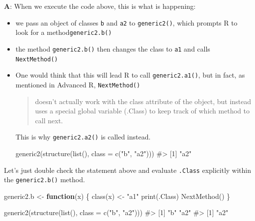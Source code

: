 \documentclass[
]{krantz}
\makeatletter
\newenvironment{Shaded}{\begin{snugshade}}{\end{snugshade}}
\newcommand{\CommentTok}[1]{\textcolor[rgb]{0.56,0.35,0.01}{\textit{#1}}}
\newcommand{\ControlFlowTok}[1]{\textcolor[rgb]{0.13,0.29,0.53}{\textbf{#1}}}
\newcommand{\DataTypeTok}[1]{\textcolor[rgb]{0.13,0.29,0.53}{#1}}
\newcommand{\KeywordTok}[1]{\textcolor[rgb]{0.13,0.29,0.53}{\textbf{#1}}}
\newcommand{\NormalTok}[1]{#1}
\newcommand{\StringTok}[1]{\textcolor[rgb]{0.31,0.60,0.02}{#1}}
\newenvironment{kframe}{%
\medskip{}
\setlength{\fboxsep}{.8em}
 \def\at@end@of@kframe{}%
 \ifinner\ifhmode%
  \def\at@end@of@kframe{\end{minipage}}%
  \begin{minipage}{\columnwidth}%
 \fi\fi%
 \def\FrameCommand##1{\hskip\@totalleftmargin \hskip-\fboxsep
 \colorbox{shadecolor}{##1}\hskip-\fboxsep
     \hskip-\linewidth \hskip-\@totalleftmargin \hskip\columnwidth}%
 \MakeFramed {\advance\hsize-\width
   \@totalleftmargin\z@ \linewidth\hsize
   \@setminipage}}%
 {\par\unskip\endMakeFramed%
 \at@end@of@kframe}
\renewenvironment{Shaded}{\begin{kframe}}{\end{kframe}}
\renewcommand{\KeywordTok} [1]{\textcolor[rgb]{0.00,0.44,0.13}{{#1}}}
\renewcommand{\DataTypeTok}[1]{\textcolor[rgb]{0.56,0.13,0.00}{{#1}}}
\renewcommand{\StringTok}  [1]{\textcolor[rgb]{0.25,0.44,0.63}{{#1}}}
\renewcommand{\CommentTok} [1]{\textcolor[rgb]{0.38,0.63,0.69}{{#1}}}
\renewcommand{\NormalTok}  [1]{{#1}}
\makeatother
\begin{document}
\textbf{{A}}: When we execute the code above, this is what is happening:

\begin{itemize}
\item
  we pass an object of classes \texttt{b} and \texttt{a2} to \texttt{generic2()}, which prompts R to look for a method\texttt{generic2.b()}
\item
  the method \texttt{generic2.b()} then changes the class to \texttt{a1} and calls \texttt{NextMethod()}
\item
  One would think that this will lead R to call \texttt{generic2.a1()}, but in fact, as mentioned in Advanced R, \texttt{NextMethod()}

  \begin{quote}
  doesn't actually work with the class attribute of the object, but instead uses a special global variable (.Class) to keep track of which method to call next.
  \end{quote}

  This is why \texttt{generic2.a2()} is called instead.

\begin{Shaded}
\begin{Highlighting}[]
\KeywordTok{generic2}\NormalTok{(}\KeywordTok{structure}\NormalTok{(}\KeywordTok{list}\NormalTok{(), }\DataTypeTok{class =} \KeywordTok{c}\NormalTok{(}\StringTok{"b"}\NormalTok{, }\StringTok{"a2"}\NormalTok{)))}
\CommentTok{#> [1] "a2"}
\end{Highlighting}
\end{Shaded}
\end{itemize}

Let's just double check the statement above and evaluate \texttt{.Class} explicitly within the \texttt{generic2.b()} method.

\begin{Shaded}
\begin{Highlighting}[]
\NormalTok{generic2.b <-}\StringTok{ }\ControlFlowTok{function}\NormalTok{(x) \{}
  \KeywordTok{class}\NormalTok{(x) <-}\StringTok{ "a1"}
  \KeywordTok{print}\NormalTok{(.Class)}
  \KeywordTok{NextMethod}\NormalTok{()}
\NormalTok{\}}

\KeywordTok{generic2}\NormalTok{(}\KeywordTok{structure}\NormalTok{(}\KeywordTok{list}\NormalTok{(), }\DataTypeTok{class =} \KeywordTok{c}\NormalTok{(}\StringTok{"b"}\NormalTok{, }\StringTok{"a2"}\NormalTok{)))}
\CommentTok{#> [1] "b"  "a2"}
\CommentTok{#> [1] "a2"}
\end{Highlighting}
\end{Shaded}
\end{document}
